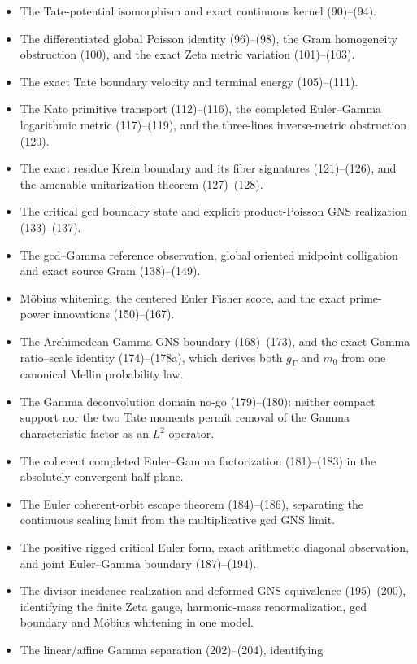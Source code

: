 \documentclass[11pt]{article}
\begin{document}
\begin{itemize}
      places and/or Gamma--Tate terminal channels.
\item The Tate-potential isomorphism and exact continuous kernel
      (90)--(94).
\item The differentiated global Poisson identity (96)--(98), the Gram
      homogeneity obstruction (100), and the exact Zeta metric variation
      (101)--(103).
\item The exact Tate boundary velocity and terminal energy (105)--(111).
\item The Kato primitive transport (112)--(116), the completed
      Euler--Gamma logarithmic metric (117)--(119), and the three-lines
      inverse-metric obstruction (120).
\item The exact residue Krein boundary and its fiber signatures
      (121)--(126), and the amenable unitarization theorem (127)--(128).
\item The critical gcd boundary state and explicit product-Poisson GNS
      realization (133)--(137).
\item The gcd--Gamma reference observation, global oriented midpoint
      colligation and exact source Gram (138)--(149).
\item M\"obius whitening, the centered Euler Fisher score, and the exact
      prime-power innovations (150)--(167).
\item The Archimedean Gamma GNS boundary (168)--(173), and the exact
      Gamma ratio--scale identity (174)--(178a), which derives both
      $g_\Gamma$ and $m_0$ from one canonical Mellin probability law.
\item The Gamma deconvolution domain no-go (179)--(180): neither compact
      support nor the two Tate moments permit removal of the Gamma
      characteristic factor as an $L^2$ operator.
\item The coherent completed Euler--Gamma factorization (181)--(183) in the
      absolutely convergent half-plane.
\item The Euler coherent-orbit escape theorem (184)--(186), separating the
      continuous scaling limit from the multiplicative gcd GNS limit.
\item The positive rigged critical Euler form, exact arithmetic diagonal
      observation, and joint Euler--Gamma boundary (187)--(194).
\item The divisor-incidence realization and deformed GNS equivalence
      (195)--(200), identifying the finite Zeta gauge, harmonic-mass
      renormalization, gcd boundary and M\"obius whitening in one model.
\item The linear/affine Gamma separation (202)--(204), identifying

\end{itemize}
\end{document}
